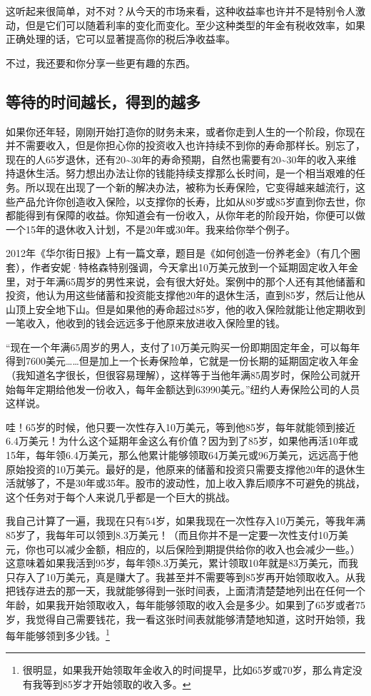 这听起来很简单，对不对？从今天的市场来看，这种收益率也许并不是特别令人激动，但是它们可以随着利率的变化而变化。至少这种类型的年金有税收效率，如果正确处理的话，它可以显著提高你的税后净收益率。

不过，我还要和你分享一些更有趣的东西。

\subsection{等待的时间越长，得到的越多}

如果你还年轻，刚刚开始打造你的财务未来，或者你走到人生的一个阶段，你现在并不需要收入，但是你担心你的投资收入也许持续不到你的寿命那样长。别忘了，现在的人65岁退休，还有20\textasciitilde{}30年的寿命预期，自然也需要有20\textasciitilde{}30年的收入来维持退休生活。努力想出办法让你的钱能持续支撑那么长时间，是一个相当艰难的任务。所以现在出现了一个新的解决办法，被称为长寿保险，它变得越来越流行，这些产品允许你创造收入保险，以支撑你的长寿，比如从80岁或85岁直到你去世，你都能得到有保障的收益。你知道会有一份收入，从你年老的阶段开始，你便可以做一个15年的退休收入计划，不是20年或30年。我来给你举个例子。

2012年《华尔街日报》上有一篇文章，题目是《如何创造一份养老金》（有几个圈套），作者安妮·特格森特别强调，今天拿出10万美元放到一个延期固定收入年金里，对于年满65周岁的男性来说，会有很大好处。案例中的那个人还有其他储蓄和投资，他认为用这些储蓄和投资能支撑他20年的退休生活，直到85岁，然后让他从山顶上安全地下山。但是如果他的寿命超过85岁，他的收入保险就能让他定期收到一笔收入，他收到的钱会远远多于他原来放进收入保险里的钱。

“现在一个年满65周岁的男人，支付了10万美元购买一份即期固定年金，可以每年得到7600美元……但是加上一个长寿保险单，它就是一份长期的延期固定收入年金（我知道名字很长，但很容易理解），这样等于当他年满85周岁时，保险公司就开始每年定期给他发一份收入，每年金额达到63990美元。”纽约人寿保险公司的人员这样说。

哇！65岁的时候，他只要一次性存入10万美元，等到他85岁，每年就能领到接近6.4万美元！为什么这个延期年金这么有价值？因为到了85岁，如果他再活10年或15年，每年领6.4万美元，那么他累计能够领取64万美元或96万美元，远远高于他原始投资的10万美元。最好的是，他原来的储蓄和投资只需要支撑他20年的退休生活就够了，不是30年或35年。股市的波动性，加上收入靠后顺序不可避免的挑战，这个任务对于每个人来说几乎都是一个巨大的挑战。

我自己计算了一遍，我现在只有54岁，如果我现在一次性存入10万美元，等我年满85岁了，我每年可以领到8.3万美元！（而且你并不是一定要一次性支付10万美元，你也可以减少金额，相应的，以后保险到期提供给你的收入也会减少一些。）这意味着如果我活到95岁，每年领8.3万美元，累计领取10年就是83万美元，而我只存入了10万美元，真是赚大了。我甚至并不需要等到85岁再开始领取收入。从我把钱存进去的那一天，我就能够得到一张时间表，上面清清楚楚地列出在任何一个年龄，如果我开始领取收入，每年能够领取的收入会是多少。如果到了65岁或者75岁，我觉得自己需要钱花，我一看这张时间表就能够清楚地知道，这时开始领，我每年能够领到多少钱。\footnote{\label{fn:pdf-29-2}很明显，如果我开始领取年金收入的时间提早，比如65岁或70岁，那么肯定没有我等到85岁才开始领取的收入多。}

